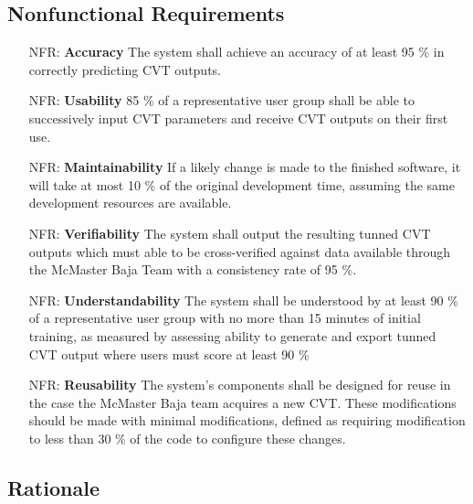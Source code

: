 \documentclass[12pt]{article}
\newcounter{nfrnum} %
\begin{document}
\subsection{Nonfunctional Requirements}

\noindent \begin{itemize}

\item[NFR\refstepcounter{nfrnum}\thenfrnum \label{NFR_Accuracy}:]\textbf{Accuracy} The system shall achieve an accuracy of at least 95 \% in correctly predicting CVT outputs.
\item[NFR\refstepcounter{nfrnum}\thenfrnum \label{NFR_Usability}:] \textbf{Usability} 85 \% of a representative user group shall be able to successively input CVT parameters and receive CVT outputs on their first use.
\item[NFR\refstepcounter{nfrnum}\thenfrnum \label{NFR_Maintainability}:]\textbf{Maintainability} If a likely change is made to the finished software, it will take at most 10 \% of the original development time, assuming the same development resources are available.
\item[NFR\refstepcounter{nfrnum}\thenfrnum \label{NFR_Verifiability}:] \textbf{Verifiability} The system shall output the resulting tunned CVT outputs which must able to be cross-verified against data available through the McMaster Baja Team with a consistency rate of 95 \%.
\item[NFR\refstepcounter{nfrnum}\thenfrnum \label{NFR_Understandability}:] \textbf{Understandability} The system shall be understood by at least 90 \% of a representative user group with no more than 15 minutes of initial training, as measured by assessing ability to generate and export tunned CVT output where users must score at least 90 \%
\item[NFR\refstepcounter{nfrnum}\thenfrnum \label{NFR_Reusability}:] \textbf{Reusability} The system's components shall be designed for reuse in the case the McMaster Baja team acquires a new CVT. These modifications should be made with minimal modifications, defined as requiring modification to less than 30 \% of the code to configure these changes.

\end{itemize}

\subsection{Rationale}
\end{document}
